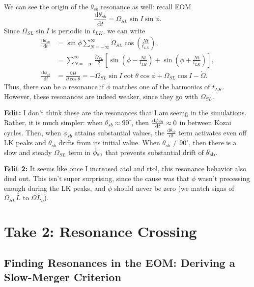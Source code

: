 \documentclass[11pt,
        usenames, %
        dvipsnames %
    ]{article}
\newcommand*{\rd}[2]{\frac{\mathrm{d}#1}{\mathrm{d}#2}}
\newcommand*{\pd}[2]{\frac{\partial#1}{\partial#2}}
\newcommand*{\p}[1]{\left(#1\right)}
\newcommand*{\s}[1]{\left[#1\right]}
\begin{document}
We can see the origin of the $\theta_{sb}$ resonance as well: recall EOM
\begin{equation}
    \rd{\theta_{sb}}{t} = \Omega_{SL}\sin I \sin \phi.
\end{equation}
Since $\Omega_{SL}\sin I$ is periodic in $t_{LK}$, we can write
\begin{align}
    \rd{\theta_{sb}}{t} &= \sin \phi \sum\limits_{N = -\infty}^\infty
            \tilde{\Omega}_{SL}\cos\p{\frac{Nt}{t_{LK}}},\\
        &= \sum\limits_{N = -\infty}^\infty
            \frac{\tilde{\Omega}_{SL}}{2}\s{\sin\p{\phi - \frac{Nt}{t_{LK}}}
                + \sin \p{\phi + \frac{Nt}{t_{LK}}}},\\
    \rd{\phi_{sb}}{t} &= \pd{H}{\cos \theta}
        = -\Omega_{SL}\sin I \cot \theta \cos \phi + \Omega_{SL}\cos I
            - \dot{\Omega}.
\end{align}
Thus, there can be a resonance if $\dot{\phi}$ matches one of the harmonics of
$t_{LK}$. However, these resonances are indeed weaker, since they go with
$\Omega_{SL}$.

\textbf{Edit:} I don't think these are the resonances that I am seeing in the
simulations. Rather, it is much simpler: when $\theta_{sb} \approx 90^\circ$,
then $\rd{\phi_{\rm sb}}{t} \approx 0$ in between Kozai cycles. Then, when
$\phi_{sb}$ attains substantial values, the $\rd{\theta_{sb}}{t}$ term
activates even off LK peaks and $\theta_{sb}$ drifts from its initial
value. When $\theta_{sb} \neq 90^\circ$, then there is a slow and steady
$\Omega_{SL}$ term in $\dot{\phi}_{\rm sb}$ that prevents substantial drift of
$\theta_{\rm sb}$.

\textbf{Edit 2:} It seems like once I increased atol and rtol, this resonance
behavior also died out. This isn't super surprising, since the cause was that
$\phi$ wasn't precessing enough during the LK peaks, and $\dot{\phi}$ should
never be zero (we match signs of $\Omega_{SL} \hat{L}$ to $\dot{\Omega}
\hat{L}_o$).

\section{Take 2: Resonance Crossing}

\subsection{Finding Resonances in the EOM\@: Deriving a Slow-Merger Criterion}
\end{document}
